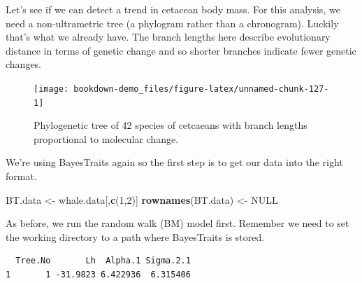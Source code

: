 \documentclass[
]{book}
\newenvironment{Shaded}{\begin{snugshade}}{\end{snugshade}}
\newcommand{\DecValTok}[1]{\textcolor[rgb]{0.00,0.00,0.81}{#1}}
\newcommand{\KeywordTok}[1]{\textcolor[rgb]{0.13,0.29,0.53}{\textbf{#1}}}
\newcommand{\NormalTok}[1]{#1}
\newcommand{\OperatorTok}[1]{\textcolor[rgb]{0.81,0.36,0.00}{\textbf{#1}}}
\newcommand{\OtherTok}[1]{\textcolor[rgb]{0.56,0.35,0.01}{#1}}
\newcommand{\StringTok}[1]{\textcolor[rgb]{0.31,0.60,0.02}{#1}}
\begin{document}
Let's see if we can detect a trend in cetacean body mass. For this analysis, we need a non-ultrametric tree (a phylogram rather than a chronogram). Luckily that's what we already have. The branch lengths here describe evolutionary distance in terms of genetic change and so shorter branches indicate fewer genetic changes.

\begin{figure}[H]

{\centering \texttt{[image: bookdown-demo\_files/figure-latex/unnamed-chunk-127-1]} 

}

\caption{Phylogenetic tree of 42 species of cetcaeans with branch lengths proportional to molecular change.}\label{fig:unnamed-chunk-127}
\end{figure}

We're using BayesTraits again so the first step is to get our data into the right format.

\begin{Shaded}
\begin{Highlighting}[]
\NormalTok{BT.data \textless{}{-}}\StringTok{ }\NormalTok{whale.data[,}\KeywordTok{c}\NormalTok{(}\DecValTok{1}\NormalTok{,}\DecValTok{2}\NormalTok{)]}
\KeywordTok{rownames}\NormalTok{(BT.data) \textless{}{-}}\StringTok{ }\OtherTok{NULL}
\end{Highlighting}
\end{Shaded}

As before, we run the random walk (BM) model first. Remember we need to set the working directory to a path where BayesTraits is stored.

\begin{Shaded}
\end{Shaded}

\begin{verbatim}
  Tree.No       Lh  Alpha.1 Sigma.2.1
1       1 -31.9823 6.422936  6.315406
\end{verbatim}
\end{document}
